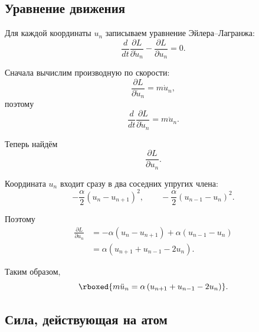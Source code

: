\documentclass[../final.tex]{subfiles}
\begin{document}
\subsection*{Уравнение движения}

Для каждой координаты $u_n$ записываем
уравнение Эйлера--Лагранжа:
%
\begin{equation*}
    \frac{d}{dt}
    \frac{\partial L}{\partial\dot u_n}
    -
    \frac{\partial L}{\partial u_n}
    =
    0.
\end{equation*}

Сначала вычислим производную по скорости:
%
\begin{equation*}
    \frac{\partial L}{\partial\dot u_n}
    =
    m\dot u_n,
\end{equation*}
%
поэтому
%
\begin{equation*}
    \frac{d}{dt}
    \frac{\partial L}{\partial\dot u_n}
    =
    m\ddot u_n.
\end{equation*}

Теперь найдём
%
\begin{equation*}
    \frac{\partial L}{\partial u_n}.
\end{equation*}

Координата $u_n$ входит сразу в два соседних упругих члена:
%
\begin{equation*}
    -\frac{\alpha}{2}(u_n-u_{n+1})^2,
    \qquad
    -\frac{\alpha}{2}(u_{n-1}-u_n)^2.
\end{equation*}

Поэтому
%
\begin{align*}
    \frac{\partial L}{\partial u_n}
    &=
    -\alpha(u_n-u_{n+1})
    +
    \alpha(u_{n-1}-u_n)
    \\
    &=
    \alpha
    \left(
        u_{n+1}
        +
        u_{n-1}
        -
        2u_n
    \right).
\end{align*}

Таким образом,
%
\begin{equation*}
    \rboxed{
        m\ddot u_n
        =
        \alpha
        \left(
            u_{n+1}
            +
            u_{n-1}
            -
            2u_n
        \right)
    }.
\end{equation*}



\subsection*{Сила, действующая на атом}
\end{document}
